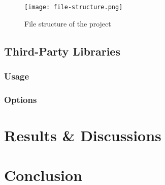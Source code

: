 \begin{figure}[h!]
    \centering
    \texttt{[image: file-structure.png]}
    \caption{File structure of the project}
    \label{fig:file-structure}
\end{figure}

\subsection{Third-Party Libraries}

\subsubsection{Usage}
\subsubsection{Options}

\section{Results \& Discussions}

\section{Conclusion}

